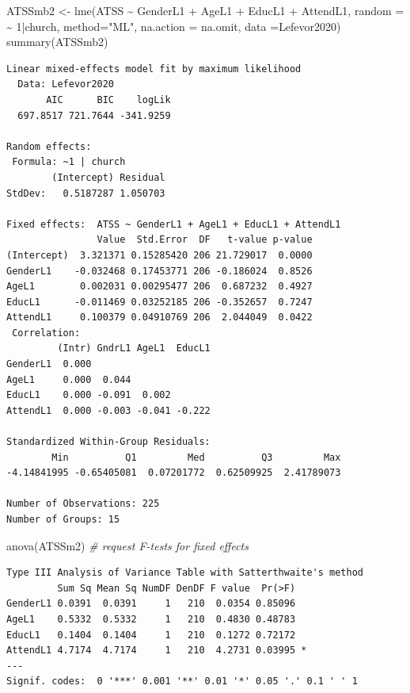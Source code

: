 \documentclass[
  11pt,
]{book}
\newenvironment{Shaded}{\begin{snugshade}}{\end{snugshade}}
\newcommand{\AttributeTok}[1]{\textcolor[rgb]{0.77,0.63,0.00}{#1}}
\newcommand{\CommentTok}[1]{\textcolor[rgb]{0.56,0.35,0.01}{\textit{#1}}}
\newcommand{\DecValTok}[1]{\textcolor[rgb]{0.00,0.00,0.81}{#1}}
\newcommand{\FunctionTok}[1]{\textcolor[rgb]{0.00,0.00,0.00}{#1}}
\newcommand{\NormalTok}[1]{#1}
\newcommand{\OtherTok}[1]{\textcolor[rgb]{0.56,0.35,0.01}{#1}}
\newcommand{\SpecialCharTok}[1]{\textcolor[rgb]{0.00,0.00,0.00}{#1}}
\newcommand{\StringTok}[1]{\textcolor[rgb]{0.31,0.60,0.02}{#1}}
\begin{document}
\begin{Shaded}
\begin{Highlighting}[]
\NormalTok{ATSSmb2 }\OtherTok{\textless{}{-}} \FunctionTok{lme}\NormalTok{(ATSS }\SpecialCharTok{\textasciitilde{}}\NormalTok{  GenderL1 }\SpecialCharTok{+}\NormalTok{ AgeL1 }\SpecialCharTok{+}\NormalTok{ EducL1 }\SpecialCharTok{+}\NormalTok{ AttendL1, }\AttributeTok{random =} \SpecialCharTok{\textasciitilde{}} \DecValTok{1}\SpecialCharTok{|}\NormalTok{church, }\AttributeTok{method=}\StringTok{"ML"}\NormalTok{, }\AttributeTok{na.action =}\NormalTok{ na.omit, }\AttributeTok{data =}\NormalTok{Lefevor2020)}
\FunctionTok{summary}\NormalTok{(ATSSmb2)}
\end{Highlighting}
\end{Shaded}

\begin{verbatim}
Linear mixed-effects model fit by maximum likelihood
  Data: Lefevor2020 
       AIC      BIC    logLik
  697.8517 721.7644 -341.9259

Random effects:
 Formula: ~1 | church
        (Intercept) Residual
StdDev:   0.5187287 1.050703

Fixed effects:  ATSS ~ GenderL1 + AgeL1 + EducL1 + AttendL1 
                Value  Std.Error  DF   t-value p-value
(Intercept)  3.321371 0.15285420 206 21.729017  0.0000
GenderL1    -0.032468 0.17453771 206 -0.186024  0.8526
AgeL1        0.002031 0.00295477 206  0.687232  0.4927
EducL1      -0.011469 0.03252185 206 -0.352657  0.7247
AttendL1     0.100379 0.04910769 206  2.044049  0.0422
 Correlation: 
         (Intr) GndrL1 AgeL1  EducL1
GenderL1  0.000                     
AgeL1     0.000  0.044              
EducL1    0.000 -0.091  0.002       
AttendL1  0.000 -0.003 -0.041 -0.222

Standardized Within-Group Residuals:
        Min          Q1         Med          Q3         Max 
-4.14841995 -0.65405081  0.07201772  0.62509925  2.41789073 

Number of Observations: 225
Number of Groups: 15 
\end{verbatim}

\begin{Shaded}
\begin{Highlighting}[]
\FunctionTok{anova}\NormalTok{(ATSSm2) }\CommentTok{\# request F{-}tests for fixed effects}
\end{Highlighting}
\end{Shaded}

\begin{verbatim}
Type III Analysis of Variance Table with Satterthwaite's method
         Sum Sq Mean Sq NumDF DenDF F value  Pr(>F)  
GenderL1 0.0391  0.0391     1   210  0.0354 0.85096  
AgeL1    0.5332  0.5332     1   210  0.4830 0.48783  
EducL1   0.1404  0.1404     1   210  0.1272 0.72172  
AttendL1 4.7174  4.7174     1   210  4.2731 0.03995 *
---
Signif. codes:  0 '***' 0.001 '**' 0.01 '*' 0.05 '.' 0.1 ' ' 1
\end{verbatim}
\end{document}
